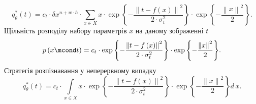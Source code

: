 \begin{equation*}
  q^*_{\theta}\left( t \right)
  = c_t \cdot \delta x^{n + w \cdot h}
    \cdot \sum_{x \in X}
      x
      \cdot \exp{\left\{ - \frac{\left\| t - f\left( x \right) \right\|^2}
                                {2 \cdot \sigma_t^2} \right\}}
      \cdot \exp{\left\{ - \frac{\left\| x \right\|^2}{2} \right\}}.
\end{equation*}
Щільність розподілу набору параметрів $x$ на даному зображенні $t$
\begin{equation*}
  p\left( x \mcond t \right)
  = c_t
    \cdot \exp{\left\{ - \frac{\left\| t - f\left( x \right) \right\|^2}
                              {2 \cdot \sigma_t^2} \right\}}
    \cdot \exp{\left\{ - \frac{\left\| x \right\|^2}{2} \right\}}.
\end{equation*}
Стратегія розпізнавання у неперервному випадку
\begin{equation*}
  q^*_{\theta}\left( t \right)
  = c_t
    \cdot \int\limits_{x \in X}
      x
      \cdot \exp{\left\{ - \frac{\left\| t - f\left( x \right) \right\|^2}
                                {2 \cdot \sigma_t^2} \right\}}
      \cdot \exp{\left\{ - \frac{\left\| x \right\|^2}{2} \right\}}
    d\,x.
\end{equation*}
